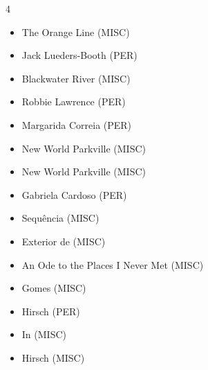 \documentclass{article}
\begin{document}
\begin{multicols}{4}
\begin{itemize}
Anderson (PER)
\item The Orange Line (MISC)
\item Jack Lueders-Booth (PER)
\item Blackwater River (MISC)
\item Robbie 
Lawrence (PER)
\item Margarida Correia (PER)
\item New World Parkville (MISC)
\item New World Parkville (MISC)
\item Gabriela Cardoso (PER)
\item Sequência (MISC)
\item Exterior  de (MISC)
\item An Ode to the Places I Never Met (MISC)
\item Gomes (MISC)
\item Hirsch (PER)
\item In (MISC)
\item Hirsch (MISC)

\end{itemize}
\end{multicols}
\end{document}

